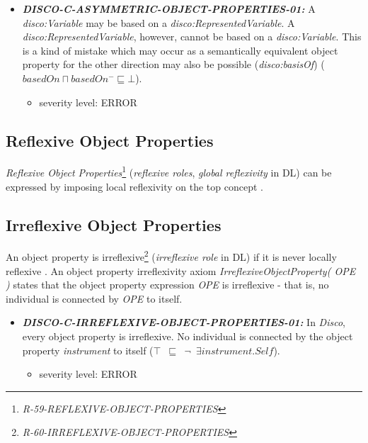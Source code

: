 \documentclass{llncs}
\newcommand{\ms}[1]{\texttt{#1}}
\begin{document}
\begin{itemize}
	\item \textbf{{\em DISCO-C-ASYMMETRIC-OBJECT-PROPERTIES-01:}} 
A {\em disco:Variable} may be based on a {\em disco:RepresentedVariable}.
A {\em disco:RepresentedVariable}, however, cannot be based on a {\em disco:Variable}.
This is a kind of mistake which may occur as a semantically equivalent object property for the other direction may also be possible ({\em disco:basisOf}) (\ms{$basedOn \sqcap basedOn^{-} \sqsubseteq \bot$}).
	\begin{itemize}
		\item severity level: ERROR
	\end{itemize}
\end{itemize}

\subsection{Reflexive Object Properties}

\emph{Reflexive Object Properties}\footnote{\emph{R-59-REFLEXIVE-OBJECT-PROPERTIES}} (\emph{reflexive roles}, \emph{global reflexivity} in DL) can be expressed by imposing local reflexivity on the top concept \cite{Kroetzsch2012}.

\subsection{Irreflexive Object Properties}

An object property is irreflexive\footnote{\emph{R-60-IRREFLEXIVE-OBJECT-PROPERTIES}} (\emph{irreflexive role} in DL) if it is never locally reflexive \cite{Kroetzsch2012}.
An object property irreflexivity axiom \emph{IrreflexiveObjectProperty( OPE )} states that the object property expression \emph{OPE} is irreflexive - that is, no individual is connected by \emph{OPE} to itself. 

\begin{itemize}
  \item \textbf{{\em DISCO-C-IRREFLEXIVE-OBJECT-PROPERTIES-01:}}
	In \emph{Disco}, every object property is irreflexive.
  No individual is connected by the object property {\em instrument} to itself (\ms{$\top$ $\sqsubseteq$ $\neg$ $\exists  instrument . Self$}).
	\begin{itemize}
		\item severity level: ERROR
	\end{itemize}
\end{itemize}
\end{document}
